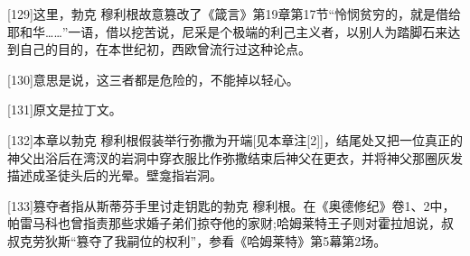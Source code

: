 \documentclass{article}
\begin{document}
[129]这里，勃克 \cdot 穆利根故意篡改了《箴言》第19章第17节“怜悯贫穷的，就是借给耶和华……”一语，借以挖苦说，尼采是个极端的利己主义者，以别人为踏脚石来达到自己的目的，在本世纪初，西欧曾流行过这种论点。



[130]意思是说，这三者都是危险的，不能掉以轻心。



[131]原文是拉丁文。



[132]本章以勃克 \cdot 穆利根假装举行弥撒为开端[见本章注[2]]，结尾处又把一位真正的神父出浴后在湾汊的岩洞中穿衣服比作弥撒结束后神父在更衣，并将神父那圈灰发描述成圣徒头后的光晕。壁龛指岩洞。



[133]篡夺者指从斯蒂芬手里讨走钥匙的勃克 \cdot 穆利根。在《奥德修纪》卷1、2中，帕雷马科也曾指责那些求婚子弟们掠夺他的家财;哈姆莱特王子则对霍拉旭说，叔叔克劳狄斯“篡夺了我嗣位的权利”，参看《哈姆莱特》第5幕第2场。
\end{document}
